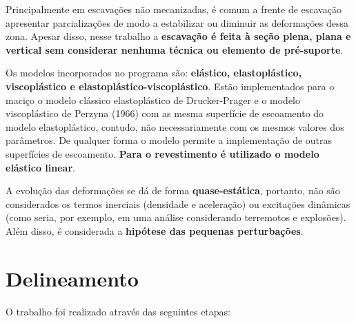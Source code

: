 Principalmente em escavações não mecanizadas, é comum a frente de escavação apresentar parcializações de modo a estabilizar ou diminuir as deformações dessa zona. Apesar disso, nesse trabalho a \textbf{escavação é feita à seção plena, plana e vertical sem considerar nenhuma técnica ou elemento de pré-suporte}.

Os modelos incorporados no programa são: \textbf{elástico, elastoplástico, viscoplástico e elastoplástico-viscoplástico}. Estão implementados para o maciço o modelo clássico elastoplástico de Drucker-Prager e o modelo viscoplástico de Perzyna (1966) com as mesma superfície de escoamento do modelo elastoplástico, contudo, não necessariamente com os mesmos valores dos parâmetros. De qualquer forma o modelo permite a implementação de outras superfícies de escoamento. \textbf{Para o revestimento é utilizado o modelo elástico linear}.

A evolução das deformações se dá de forma \textbf{quase-estática}, portanto, não são considerados os termos inerciais (densidade e aceleração) ou excitações dinâmicas (como seria, por exemplo, em uma análise considerando terremotos e explosões). Além disso, é considerada a \textbf{hipótese das pequenas perturbações}.

\section{Delineamento}

O trabalho foi realizado através das seguintes etapas:

